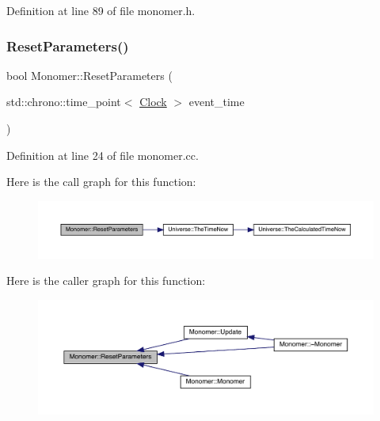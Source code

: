 Definition at line 89 of file monomer.\+h.

\mbox{\label{class_monomer_a16a692cf11117581c9b4ebbed3c04c9c}} 
\subsubsection{\texorpdfstring{Reset\+Parameters()}{ResetParameters()}}
{\footnotesize\ttfamily bool Monomer\+::\+Reset\+Parameters (\begin{DoxyParamCaption}\item[{std\+::chrono\+::time\+\_\+point$<$ \hyperlink{universe_8h_a0ef8d951d1ca5ab3cfaf7ab4c7a6fd80}{Clock} $>$}]{event\+\_\+time }\end{DoxyParamCaption})}



Definition at line 24 of file monomer.\+cc.

Here is the call graph for this function\+:
\nopagebreak
\begin{figure}[H]
\begin{center}
\leavevmode
\includegraphics[width=350pt]{class_monomer_a16a692cf11117581c9b4ebbed3c04c9c_cgraph}
\end{center}
\end{figure}
Here is the caller graph for this function\+:
\nopagebreak
\begin{figure}[H]
\begin{center}
\leavevmode
\includegraphics[width=350pt]{class_monomer_a16a692cf11117581c9b4ebbed3c04c9c_icgraph}
\end{center}
\end{figure}
\mbox{\label{class_monomer_a1ee35c888318e590082e6cd1772bb430}} 
